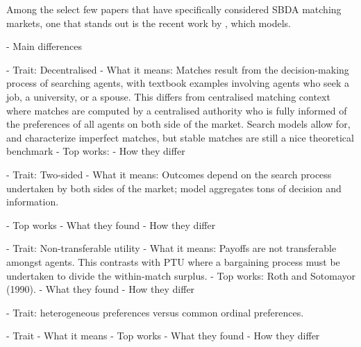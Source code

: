 Among the select few papers that have specifically considered SBDA matching markets, one that stands out is the recent work by \cite{kanoria2021facilitating}, which models.



- Main differences



- Trait: Decentralised
- What it means: Matches result from the decision-making process of searching agents, with textbook examples involving agents who seek a job, a university, or a spouse. This differs from centralised matching context where matches are computed by a centralised authority who is fully informed of the preferences of all agents on both side of the market. Search models allow for, and characterize imperfect matches, but stable matches are still a nice theoretical benchmark
- Top works: \cite{gale_shapley_1962}
    - How they differ

- Trait: Two-sided
- What it means: Outcomes depend on the search process undertaken by both sides of the market; model aggregates tons of decision and information.

- Top works
    - What they found
    - How they differ

- Trait: Non-transferable utility
- What it means: Payoffs are not transferable amongst agents. This contrasts with PTU where a bargaining process must be undertaken to divide the within-match surplus.
- Top works: Roth and Sotomayor (1990).
    - What they found
    - How they differ

- Trait: heterogeneous preferences versus common ordinal preferences.



- Trait
- What it means
- Top works
    - What they found
    - How they differ


